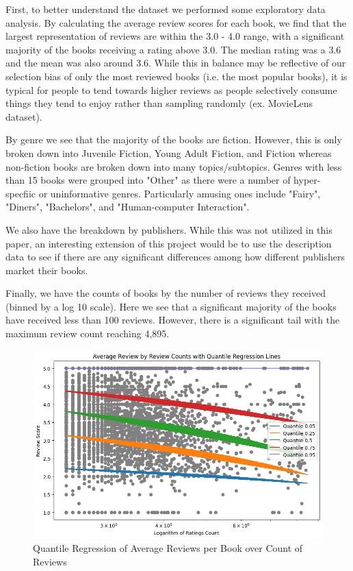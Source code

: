 \documentclass[12pt]{article}
\numberwithin{equation}{section}
\begin{document}
First, to better understand the dataset we performed some exploratory data analysis. By calculating the average review scores for each book, we find that the largest representation of reviews are within the 3.0 - 4.0 range, with a significant majority of the books receiving a rating above 3.0. The median rating was a 3.6 and the mean was also around 3.6. While this in balance may be reflective of our selection bias of only the most reviewed books (i.e. the most popular books), it is typical for people to tend towards higher reviews as people selectively consume things they tend to enjoy rather than sampling randomly (ex. MovieLens dataset).

By genre we see that the majority of the books are fiction. However, this is only broken down into Juvenile Fiction, Young Adult Fiction, and Fiction whereas non-fiction books are broken down into many topics/subtopics. Genres with less than 15 books were grouped into "Other" as there were a number of hyper-specfiic or uninformative genres. Particularly amusing ones include "Fairy", "Diners", "Bachelors", and "Human-computer Interaction".

We also have the breakdown by publishers. While this was not utilized in this paper, an interesting extension of this project would be to use the description data to see if there are any significant differences among how different publishers market their books. 

Finally, we have the counts of books by the number of reviews they received (binned by a log 10 scale). Here we see that a significant majority of the books have received less than 100 reviews. However, there is a significant tail with the maximum review count reaching 4,895.


\begin{figure}
    \centering
    \includegraphics[scale=0.58]{quantreg_reviewscore.png}
\caption{Quantile Regression of Average Reviews per Book over Count of Reviews} 
\end{figure}
\end{document}
